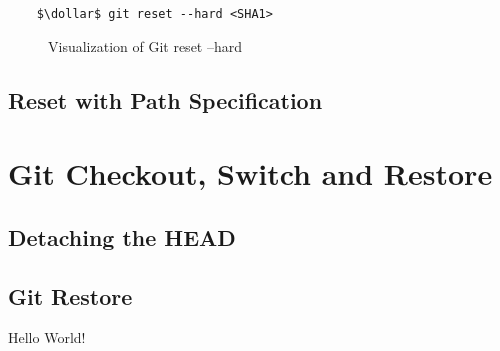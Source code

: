 
\begin{lstlisting}
	$\dollar$ git reset --hard <SHA1> 
\end{lstlisting} 

\begin{figure}[H]
	\centering
	
	\caption{Visualization of Git reset --hard}
	\label{fig:GitResetHard}
\end{figure}

 


\subsection{Reset with Path Specification}
\label{chapter:2.2.2}

\section{Git Checkout, Switch and Restore}
\label{chapter:2.3}

\subsection{Detaching the HEAD}
\label{chapter:2.3.1}

\subsection{Git Restore}
\label{chapter:2.3.2}

Hello World!


